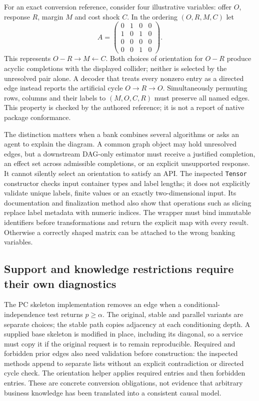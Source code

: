 For an exact conversion reference, consider four illustrative variables:
offer $O$, response $R$, margin $M$ and cost shock $C$. In the ordering
$(O,R,M,C)$ let
\begin{equation}
 A=\begin{pmatrix}
 0&1&0&0\\
 1&0&1&0\\
 0&0&0&0\\
 0&0&1&0
 \end{pmatrix}.
 \label{exec20:gcastle-matrix}
\end{equation}
This represents $O-R\to M\leftarrow C$. Both choices of orientation for
$O-R$ produce acyclic completions with the displayed collider; neither is
selected by the unresolved pair alone. A decoder that treats every nonzero
entry as a directed edge instead reports the artificial cycle $O\to R\to O$.
Simultaneously permuting rows, columns and their labels to $(M,O,C,R)$ must
preserve all named edges. This property is checked by the authored reference;
it is not a report of native package conformance.
\citep{exec20_gcastle_reference}

The distinction matters when a bank combines several algorithms or asks an
agent to explain the diagram. A common graph object may hold unresolved edges,
but a downstream DAG-only estimator must receive a justified completion, an
effect set across admissible completions, or an explicit unsupported response.
It cannot silently select an orientation to satisfy an API. The inspected
\texttt{Tensor} constructor checks input container types and label lengths;
it does not explicitly validate unique labels, finite values or an exactly
two-dimensional input. Its documentation and finalization method also show that
operations such as slicing replace label metadata with numeric indices. The
wrapper must bind immutable identifiers before transformations and return the
explicit map with every result. Otherwise a correctly shaped matrix can be
attached to the wrong banking variables. \citep{exec20_gcastle_source}

\subsection{Support and knowledge restrictions require their own diagnostics}
\label{exec20:gcastle-support}

The PC skeleton implementation removes an edge when a conditional-independence
test returns $p\geq\alpha$. The original, stable and parallel variants are
separate choices; the stable path copies adjacency at each conditioning depth.
A supplied base skeleton is modified in place, including its diagonal, so a
service must copy it if the original request is to remain reproducible. Required
and forbidden prior edges also need validation before construction: the inspected
methods append to separate lists without an explicit contradiction or directed
cycle check. The orientation helper applies required entries and then forbidden
entries. These are concrete conversion obligations, not evidence that arbitrary
business knowledge has been translated into a consistent causal model.
\citep{exec20_gcastle_source}

